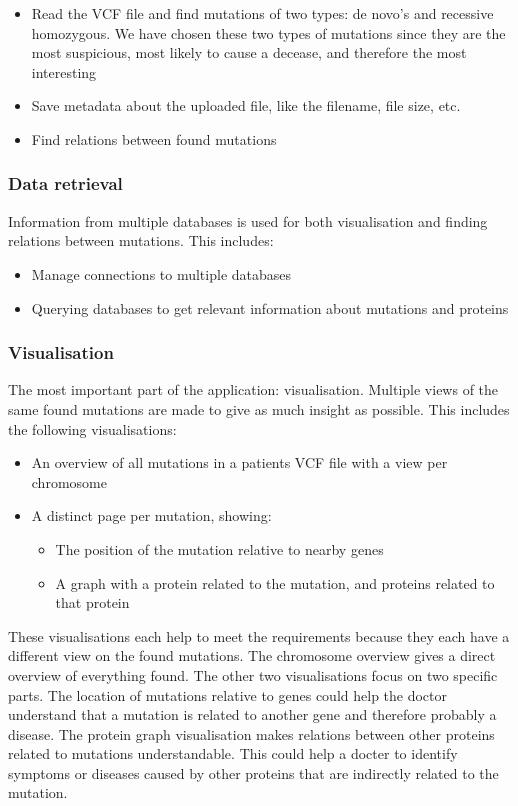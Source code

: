 \begin{itemize}
  \item Read the VCF file and find mutations of two types: de novo's and recessive homozygous. We have chosen these two types of mutations since they are the most suspicious, most likely to cause a decease, and therefore the most interesting
  \item Save metadata about the uploaded file, like the filename, file size, etc.
  \item Find relations between found mutations
\end{itemize}

\subsubsection{Data retrieval}

Information from multiple databases is used for both visualisation and finding relations between mutations. This includes:

\begin{itemize}
  \item Manage connections to multiple databases
  \item Querying databases to get relevant information about mutations and proteins
\end{itemize}

\subsubsection{Visualisation}

The most important part of the application: visualisation. Multiple views of the same found mutations are made to give as much insight as possible. This includes the following visualisations:

\begin{itemize}
  \item An overview of all mutations in a patients VCF file with a view per chromosome
  \item A distinct page per mutation, showing:
  \begin{itemize}
     \item The position of the mutation relative to nearby genes
     \item A graph with a protein related to the mutation, and proteins related to that protein
  \end{itemize}
\end{itemize}

These visualisations each help to meet the requirements because they each have a different view on the found mutations. The chromosome overview gives a direct overview of everything found. The other two visualisations focus on two specific parts. The location of mutations relative to genes could help the doctor understand that a mutation is related to another gene and therefore probably a disease. The protein graph visualisation makes relations between other proteins related to mutations understandable. This could help a docter to identify symptoms or diseases caused by other proteins that are indirectly related to the mutation.
